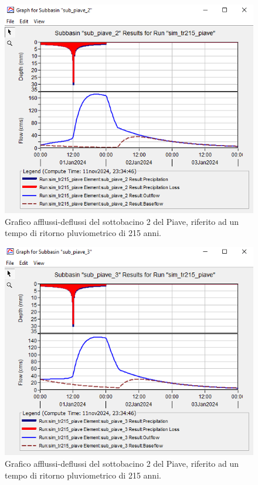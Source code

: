 \begin{figure}[H]\centering
        \includegraphics[scale=0.9]{immagini/sub2_piave_215.PNG}
        \caption{Grafico afflussi-deflussi del sottobacino 2 del Piave, riferito ad un tempo di ritorno pluviometrico di 215 anni.}
            \label{sub2_piave_215}    
\end{figure}
    
\begin{figure}[H]\centering
        \includegraphics[scale=0.9]{immagini/sub3_piave_215.PNG}
        \caption{Grafico afflussi-deflussi del sottobacino 2 del Piave, riferito ad un tempo di ritorno pluviometrico di 215 anni.}
            \label{sub3_piave_215}    
\end{figure}    

